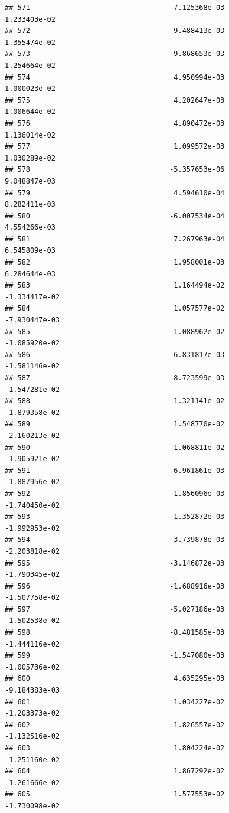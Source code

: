\documentclass[
]{article}
\begin{document}
\begin{verbatim}
## 571                                  7.125368e-03           1.233403e-02
## 572                                  9.488413e-03           1.355474e-02
## 573                                  9.868653e-03           1.254664e-02
## 574                                  4.950994e-03           1.000023e-02
## 575                                  4.202647e-03           1.006644e-02
## 576                                  4.890472e-03           1.136014e-02
## 577                                  1.099572e-03           1.030289e-02
## 578                                 -5.357653e-06           9.048847e-03
## 579                                  4.594610e-04           8.282411e-03
## 580                                 -6.007534e-04           4.554266e-03
## 581                                  7.267963e-04           6.545809e-03
## 582                                  1.958001e-03           6.284644e-03
## 583                                  1.164494e-02          -1.334417e-02
## 584                                  1.057577e-02          -7.930447e-03
## 585                                  1.088962e-02          -1.085920e-02
## 586                                  6.831817e-03          -1.581146e-02
## 587                                  8.723599e-03          -1.547281e-02
## 588                                  1.321141e-02          -1.879358e-02
## 589                                  1.548770e-02          -2.160213e-02
## 590                                  1.068811e-02          -1.905921e-02
## 591                                  6.961861e-03          -1.887956e-02
## 592                                  1.856096e-03          -1.740450e-02
## 593                                 -1.352872e-03          -1.992953e-02
## 594                                 -3.739878e-03          -2.203818e-02
## 595                                 -3.146872e-03          -1.790345e-02
## 596                                 -1.688916e-03          -1.507758e-02
## 597                                 -5.027186e-03          -1.502538e-02
## 598                                 -8.481585e-03          -1.444116e-02
## 599                                 -1.547080e-03          -1.005736e-02
## 600                                  4.635295e-03          -9.184383e-03
## 601                                  1.034227e-02          -1.203373e-02
## 602                                  1.826557e-02          -1.132516e-02
## 603                                  1.804224e-02          -1.251160e-02
## 604                                  1.867292e-02          -1.261666e-02
## 605                                  1.577553e-02          -1.730098e-02

\end{verbatim}
\end{document}
